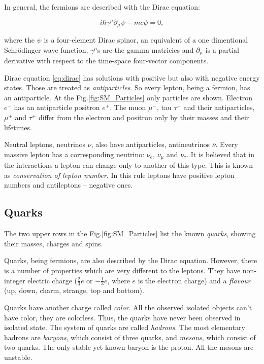 In general, the fermions are described with the Dirac equation\cite{diraceq}:

\begin{equation}\label{eq:dirac}
  i\hbar\gamma^{\mu}\partial_{\mu}\psi - mc\psi = 0 ,
\end{equation}

where the $\psi$ is a four-element Dirac spinor, an equivalent of a one dimentional Schr\"{o}dinger wave function, 
$\gamma^{\mu}$s are the gamma matricies and $\partial_{\mu}$ is a partial derivative with respect to the time-space four-vector
components. 

Dirac equation \ref{eq:dirac} has solutions with positive but also with negative energy states. Those are treated
as \textit{antiparticles}. So every lepton, being a fermion, has an antiparticle. At the Fig.\ref{fig:SM_Particles}
only particles are shown. Electron $e^{-}$ has an antiparticle positron $e^{+}$. The muon $\mu^{-}$, tau $\tau^{-}$ and
their antiparticles, $\mu^{+}$ and $\tau^{+}$ differ from the electron and positron only by their masses and their lifetimes.

Neutral leptons, neutrinos $\nu$, also have antiparticles, antineutrinos $\bar{\nu}$. Every massive lepton has a corresponding
neutrino: $\nu_{e}$, $\nu_{\mu}$ and $\nu_{\tau}$. It is believed that in the interactions a lepton can change only to another
of this type. This is known as \textit{conservation of lepton number}. In this rule leptons have positive lepton numbers and
antileptons -- negative ones.

\subsection{Quarks}\label{sec:quark}

The two upper rows in the Fig.\ref{fig:SM_Particles} list the known \textit{quarks}, showing their masses, charges and spins.

Quarks, being fermions, are also described by the Dirac equation. However, there is a number of properties which are very different
to the leptons. They have non-integer electric charge ($\frac{2}{3} e$ or $-\frac{1}{3} e$, where $e$ is the electron charge) and a 
\textit{flavour} (up, down, charm, strange, top and bottom).

Quarks have another charge called \textit{color}. All the observed isolated objects can't have color, they are colorless. Thus, the 
quarks have never been observed in isolated state. The system of quarks are called \textit{hadrons}. The most elementary hadrons are 
\textit{baryons}, which consist of three quarks, and \textit{mesons}, which consist of two quarks. The only stable yet known baryon 
is the proton. All the mesons are unstable.

